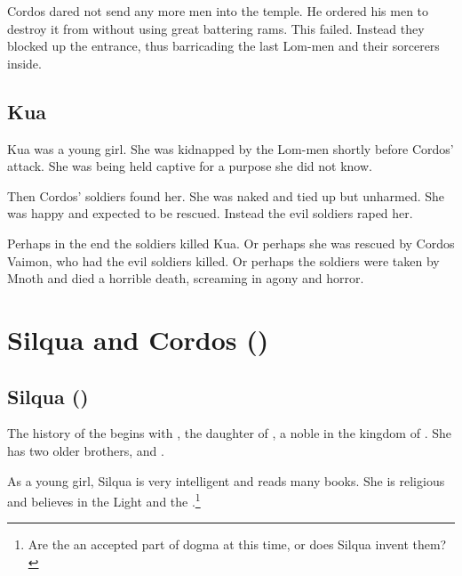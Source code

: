 Cordos dared not send any more men into the temple. 
He ordered his men to destroy it from without using great battering rams. 
This failed.
Instead they blocked up the entrance, thus barricading the last Lom-men and their sorcerers inside. 









\subsection{Kua}
Kua was a young \human girl.
She was kidnapped by the Lom-men shortly before Cordos' attack. 
She was being held captive for a purpose she did not know. 

Then Cordos' soldiers found her.
She was naked and tied up but unharmed. 
She was happy and expected to be rescued.
Instead the evil soldiers raped her. 

Perhaps in the end the soldiers killed Kua.
Or perhaps she was rescued by Cordos Vaimon, who had the evil soldiers killed.
Or perhaps the soldiers were taken by Mnoth and died a horrible death, screaming in agony and horror.















\section{Silqua and Cordos ()}









\subsection{Silqua ()}
The history of the \VaimonCaliphate begins with , the daughter of , a noble in the \human{} kingdom of . 
She has two older brothers,  and . 

As a young girl, Silqua is very intelligent and reads many books. 
She is religious and believes in the Light and the \sephiroth.\footnote{Are the \Sephiroth{} an accepted part of dogma at this time, or does Silqua invent them?}









